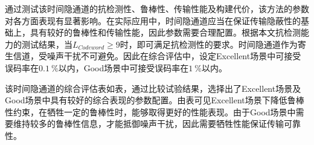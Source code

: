 通过测试该时间隐通道的抗检测性、鲁棒性、传输性能及构建代价，该方法的参数对各方面表现有显著影响。在实际应用中，时间隐通道应当在保证传输隐蔽性的基础上，具有较好的鲁棒性和传输性能，因此参数需要合理配置。根据本文抗检测能力的测试结果，当$L_{Codeword}\ge 9$时，即可满足抗检测性的要求。时间隐通道作为寄生信道，受噪声干扰不可避免。因此在综合评估中，设定Excellent场景中可接受误码率在{$0.1\ \%$}以内，Good场景中可接受误码率在{$1\ \%$}以内。


该时间隐通道的综合评估表如表，通过比较试验结果，选择出了Excellent场景及Good场景中具有较好的综合表现的参数配置。由表可见Excellent场景下降低鲁棒性约束，在牺牲一定的鲁棒性时，能够取得更好的性能表现。由于Good场景中需要维持较多的鲁棒性信息，才能抵御噪声干扰，因此需要牺牲性能保证传输可靠性。

